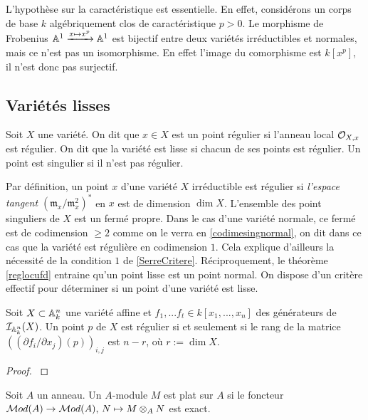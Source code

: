 \begin{rem}
L'hypothèse sur la caractéristique est essentielle. En effet, considérons un corps de base $k$ algébriquement clos de caractéristique $p>0$. Le morphisme de Frobenius $\mathbb{A}^1 \xrightarrow{x \mapsto x^p} \mathbb{A}^1$  est bijectif entre deux variétés irréductibles et normales, mais ce n'est pas un isomorphisme. En effet l'image du comorphisme est $k[x^p]$, il n'est donc pas surjectif.
\end{rem}

\subsection{Variétés lisses}

\begin{defn}
Soit $X$ une variété. On dit que $x\in X$ est un point régulier si l'anneau local $\mathcal{O}_{X,x}$ est régulier. On dit que la variété est lisse si chacun de ses points est régulier. Un point est singulier si il n'est pas régulier.
\end{defn}

Par définition, un point $x$ d'une variété $X$ irréductible est régulier si \textit{l'espace tangent $(\mathfrak{m}_x/\mathfrak{m}_x^2)^*$} en $x$ est de dimension $\dim X$. L'ensemble des point singuliers de $X$ est un fermé propre. Dans le cas d'une variété normale, ce fermé est de codimension $\geq 2$ comme on le verra en \ref{codimesingnormal}, on dit dans ce cas que la variété est régulière en codimension $1$. Cela explique d'ailleurs la nécessité de la condition $1$ de \ref{SerreCritere}. Réciproquement, le théorème \ref{reglocufd} entraine qu'un point lisse est un point normal. On dispose d'un critère effectif pour déterminer si un point d'une variété est lisse.

\begin{prop}\label{CritereReg}
Soit $X\subset \mathbb{A}^n_k$ une variété affine et $f_1,...f_t\in k[x_1,...,x_n]$ des générateurs de $\mathcal{I}_{\mathbb{A}^n_k}(X)$. Un point $p$ de $X$ est régulier si et seulement si le rang de la matrice $((\partial f_i/\partial x_j)(p))_{i,j}$ est $n-r$, où $r:=\dim X$.
\end{prop}
\begin{proof}
\cite[I.5.1]{Hartshorne} 
\end{proof}

\begin{defn}
Soit $A$ un anneau. Un  $A$-module $M$ est plat sur $A$ si le foncteur $\mathcal{M} od(A)\rightarrow \mathcal{M} od(A),\, N\mapsto M\otimes_A N$ est exact.
\end{defn}


